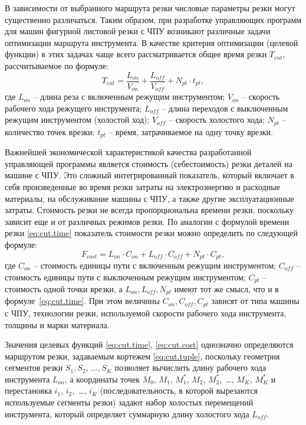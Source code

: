 В зависимости от выбранного маршрута резки
числовые параметры резки могут существенно различаться.
Таким образом, при разработке управляющих программ
для машин фигурной листовой резки с ЧПУ возникают
различные задачи оптимизации маршрута инструмента.
В качестве критерия оптимизации (целевой функции)
в этих задачах чаще всего рассматривается общее время резки
$T_{cut}$,
рассчитываемое по формуле:
\begin{equation}
  T_{cut} = \frac{L_{on}}{V_{on}} + \frac{L_{off}}{V_{off}} +N_{pt} \cdot t_{pt}
  ,
  \label{eq:cut.time}
\end{equation}
где
$L_{on}$ -- длина реза с включенным режущим инструментом;
$V_{on}$ -- скорость рабочего хода режущего инструмента;
$L_{off}$ -- длина переходов с выключенным режущим инструментом (холостой ход);
$V_{off}$ -- скорость холостого хода;
$N_{pt}$ -- количество точек врезки;
$t_{pt}$ -- время, затрачиваемое на одну точку врезки.

Важнейшей экономической характеристикой качества
разработанной управляющей программы является стоимость
(себестоимость) резки деталей на машине с ЧПУ.
Это сложный интегрированный показатель,
который включает в себя произведенные во время
резки затраты на электроэнергию и расходные материалы,
на обслуживание машины с ЧПУ,
а также другие эксплуатационные затраты.
Стоимость резки не всегда
пропорциональна времени резки,
поскольку зависит еще и от различных режимов резки.
По аналогии с формулой времени резки \eqref{eq:cut.time}
показатель стоимости резки можно определить по следующей формуле:
\begin{equation}
  F_{cost}=
  L_{on} \cdot C_{on} +
  L_{off} \cdot C_{off} +
  N_{pt} \cdot C_{pt}
  ,
  \label{eq:cut.cost}
\end{equation}
где
$C_{on}$ -- стоимость единицы пути с включенным режущим инструментом;
$C_{off}$ -- стоимость единицы пути с выключенным режущим инструментом;
$C_{pt}$ -- стоимость одной точки врезки,
а $L_{on}, L_{off}, N_{pt}$
имеют тот же смысл, что и в формуле~\eqref{eq:cut.time}.
При этом величины $C_{on}, C_{off}, C_{pt}$
зависят от типа машины с ЧПУ,
технологии резки, используемой скорости рабочего хода инструмента,
толщины и марки материала.

Значения целевых функций \eqref{eq:cut.time}, \eqref{eq:cut.cost}
однозначно определяются маршрутом резки,
задаваемым кортежем \eqref{eq:cut.tuple},
поскольку геометрия сегментов резки
$S_1, S_2, \,\dots, S_K$
позволяет вычислить длину рабочего хода инструмента $L_{on}$,
а координаты точек
$M_0$, $M_1$, $M_1^*$, $M_2$, $M_2^*$, \,\dots, $M_K$, $M_K^*$
и перестановка
$i_1$, $i_2$, \,\dots, $i_K$
(последовательность, в которой вырезаются используемые сегменты резки)
задают набор холостых перемещений инструмента,
который определяет суммарную длину холостого хода
$L_{off}$.

